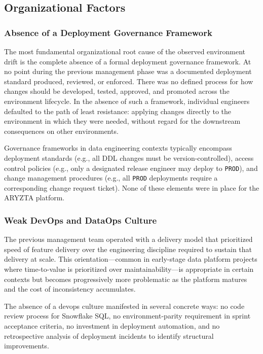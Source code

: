 \subsection{Organizational Factors}
\label{subsec:org-factors}

\subsubsection{Absence of a Deployment Governance Framework}

The most fundamental organizational root cause of the observed environment drift is the complete absence of a formal deployment governance framework. At no point during the previous management phase was a documented deployment standard produced, reviewed, or enforced. There was no defined process for how changes should be developed, tested, approved, and promoted across the environment lifecycle. In the absence of such a framework, individual engineers defaulted to the path of least resistance: applying changes directly to the environment in which they were needed, without regard for the downstream consequences on other environments.

Governance frameworks in data engineering contexts typically encompass deployment standards (e.g., all DDL changes must be version-controlled), access control policies (e.g., only a designated release engineer may deploy to \texttt{PROD}), and change management procedures (e.g., all \texttt{PROD} deployments require a corresponding change request ticket). None of these elements were in place for the ARYZTA platform.

\subsubsection{Weak DevOps and DataOps Culture}

The previous management team operated with a delivery model that prioritized speed of feature delivery over the engineering discipline required to sustain that delivery at scale. This orientation---common in early-stage data platform projects where time-to-value is prioritized over maintainability---is appropriate in certain contexts but becomes progressively more problematic as the platform matures and the cost of inconsistency accumulates.

The absence of a \gls{devops} culture manifested in several concrete ways: no code review process for Snowflake SQL, no environment-parity requirement in sprint acceptance criteria, no investment in deployment automation, and no retrospective analysis of deployment incidents to identify structural improvements.

